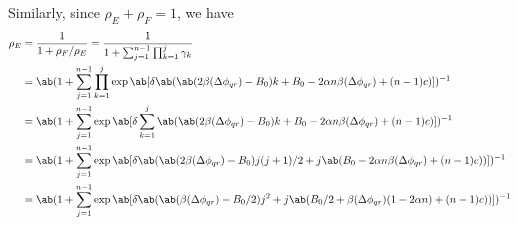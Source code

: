 Similarly, since $\rho_E + \rho_F = 1$, we have
\begin{equation}
  \begin{aligned}
    \rho_E &= \frac{1}{1+\rho_F/\rho_E}
           = \frac{1}{1+\sum_{j=1}^{n-1} \prod_{k=1}^j \gamma_k} \\
           &= \ab(1+\sum_{j=1}^{n-1} \prod_{k=1}^j \exp\ab[\delta \ab(
           \ab(2 \beta(\Delta\phi_{qr}) - B_0) k
           + B_0 - 2 \alpha n \beta(\Delta\phi_{qr}) + (n-1) c)])^{-1}
                 \\
           &= \ab(1+\sum_{j=1}^{n-1} \exp\ab[\delta \sum_{k=1}^j \ab(
           \ab(2 \beta(\Delta\phi_{qr}) - B_0) k
           + B_0 - 2 \alpha n \beta(\Delta\phi_{qr}) + (n-1) c)])^{-1}
                 \\
           &= \ab(1+\sum_{j=1}^{n-1} \exp\ab[\delta \ab(
           \ab(2 \beta(\Delta\phi_{qr}) - B_0) j(j+1)/2
           + j \ab(B_0 - 2 \alpha n \beta(\Delta\phi_{qr}) + (n-1) c))])^{-1}
                 \\
           &= \ab(1+\sum_{j=1}^{n-1} \exp\ab[\delta \ab(
           \ab(\beta(\Delta\phi_{qr}) - B_0/2) j^2
           + j \ab(B_0/2 + \beta(\Delta\phi_{qr}) (1 - 2 \alpha n)  + (n-1) c))])^{-1}
  \end{aligned}
  \label{eq:comm_fixation_prob}
\end{equation}

